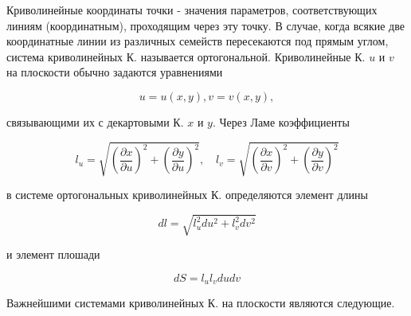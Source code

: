 \documentclass[10pt]{article}
\begin{document}
Криволинейные координаты точки - значения параметров, соответствующих линиям (координатным), проходящим через эту точку. В случае, когда всякие две координатные линии из различных семейств пересекаются под прямым углом, система криволинейных К. называется ортогональной. Криволинейные К. $u$ и $v$ на плоскости обычно задаются уравнениями



\[

u=u(x, y), v=v(x, y),

\]



связывающими их с декартовыми К. $x$ и $y$. Через Ламе коэффициенты



\[

l_{u}=\sqrt{\left(\frac{\partial x}{\partial u}\right)^{2}+\left(\frac{\partial y}{\partial u}\right)^{2}}, \quad l_{v}=\sqrt{\left(\frac{\partial x}{\partial v}\right)^{2}+\left(\frac{\partial y}{\partial v}\right)^{2}}

\]



в системе ортогональных криволинейных К. определяются элемент длины



\[

d l=\sqrt{l_{u}^{2} d u^{2}+l_{v}^{2} d v^{2}}

\]



и элемент плошади



\[

d S=l_{u} l_{v} d u d v

\]



Важнейшими системами криволинейных К. на плоскости являются следующие.
\end{document}
